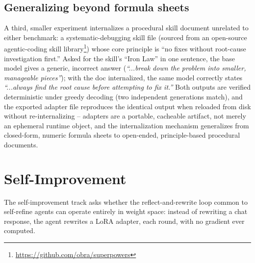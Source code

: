 \documentclass[11pt]{article}
\begin{document}
\subsection{Generalizing beyond formula sheets}

A third, smaller experiment internalizes a procedural skill document unrelated to either benchmark: a systematic-debugging skill file (sourced from an open-source agentic-coding skill library\footnote{\url{https://github.com/obra/superpowers}}) whose core principle is ``no fixes without root-cause investigation first.'' Asked for the skill's ``Iron Law'' in one sentence, the base model gives a generic, incorrect answer (\emph{``...break down the problem into smaller, manageable pieces''}); with the doc internalized, the same model correctly states \emph{``...always find the root cause before attempting to fix it.''} Both outputs are verified deterministic under greedy decoding (two independent generations match), and the exported adapter file reproduces the identical output when reloaded from disk without re-internalizing -- adapters are a portable, cacheable artifact, not merely an ephemeral runtime object, and the internalization mechanism generalizes from closed-form, numeric formula sheets to open-ended, principle-based procedural documents.

\section{Self-Improvement}
\label{sec:selfimprovement}

The self-improvement track asks whether the reflect-and-rewrite loop common to self-refine agents \citep{madaan2023selfrefine,shinn2023reflexion} can operate entirely in weight space: instead of rewriting a chat response, the agent rewrites a LoRA adapter, each round, with no gradient ever computed.
\end{document}
